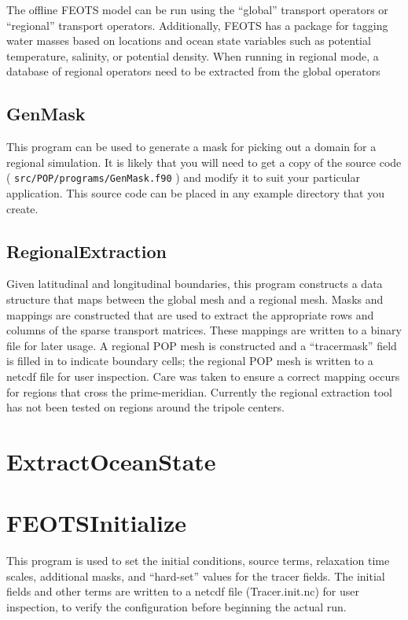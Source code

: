\documentclass{softwaremanual}
\begin{document}
The offline FEOTS model can be run using the ``global'' transport operators or ``regional'' transport operators. Additionally, FEOTS has a package for tagging water masses based on locations and ocean state variables such as potential temperature, salinity, or potential density. When running in regional mode, a database of regional operators need to be extracted from the global operators
\subsection{GenMask}
This program can be used to generate a mask for picking out a domain for a regional simulation. It is likely that you will need to get a copy of the source code ( \texttt{src/POP/programs/GenMask.f90} ) and modify it to suit your particular application. This source code can be placed in any example directory that you create.

\subsection{RegionalExtraction}
Given latitudinal and longitudinal boundaries, this program constructs a data structure that maps between the global mesh and a regional mesh. Masks and mappings are constructed that are used to extract the appropriate rows and columns of the sparse transport matrices. These mappings are written to a binary file for later usage. A regional POP mesh is constructed and a “tracermask” field is filled in to indicate boundary cells; the regional POP mesh is written to a netcdf file for user inspection. Care was taken to ensure a correct mapping occurs for regions that cross the prime-meridian. Currently the regional extraction tool has not been tested on regions around the tripole centers.

\section{ExtractOceanState}

\section{FEOTSInitialize}
This program is used to set the initial conditions, source terms, relaxation time scales, additional masks, and “hard-set” values for the tracer fields. The initial fields and other terms are written to a netcdf file (Tracer.init.nc) for user inspection, to verify the configuration before beginning the actual run.
\end{document}
